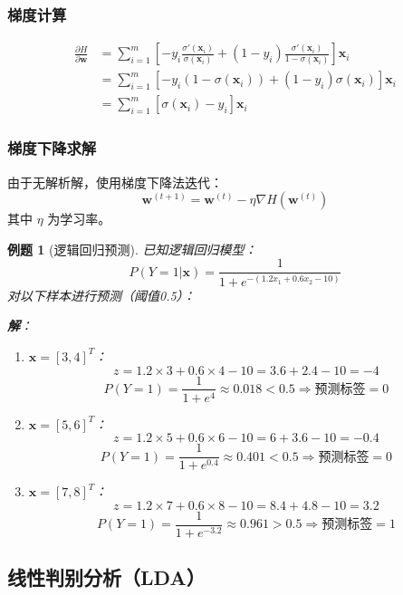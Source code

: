 \documentclass[12pt,a4paper]{ctexart}
\newtheorem{exercise}{例题}[section]
\begin{document}
\subsubsection{梯度计算}

\begin{align*}
\frac{\partial H}{\partial \mathbf{w}} &= \sum_{i=1}^{m}\left[-y_i\frac{\sigma'(\mathbf{x}_i)}{\sigma(\mathbf{x}_i)} + (1-y_i)\frac{\sigma'(\mathbf{x}_i)}{1-\sigma(\mathbf{x}_i)}\right]\mathbf{x}_i \\
&= \sum_{i=1}^{m}\left[-y_i(1-\sigma(\mathbf{x}_i)) + (1-y_i)\sigma(\mathbf{x}_i)\right]\mathbf{x}_i \\
&= \sum_{i=1}^{m}\left[\sigma(\mathbf{x}_i) - y_i\right]\mathbf{x}_i
\end{align*}

\subsubsection{梯度下降求解}

由于无解析解，使用梯度下降法迭代：
\[
\mathbf{w}^{(t+1)} = \mathbf{w}^{(t)} - \eta \nabla H(\mathbf{w}^{(t)})
\]
其中 $\eta$ 为学习率。

\begin{exercise}[逻辑回归预测]
已知逻辑回归模型：
\[
P(Y=1|\mathbf{x}) = \frac{1}{1 + e^{-(1.2x_1 + 0.6x_2 - 10)}}
\]
对以下样本进行预测（阈值0.5）：

\textbf{解}：
\begin{enumerate}
    \item $\mathbf{x} = [3, 4]^T$：
    \[
    z = 1.2 \times 3 + 0.6 \times 4 - 10 = 3.6 + 2.4 - 10 = -4
    \]
    \[
    P(Y=1) = \frac{1}{1+e^4} \approx 0.018 < 0.5 \Rightarrow \text{预测标签} = 0
    \]
    
    \item $\mathbf{x} = [5, 6]^T$：
    \[
    z = 1.2 \times 5 + 0.6 \times 6 - 10 = 6 + 3.6 - 10 = -0.4
    \]
    \[
    P(Y=1) = \frac{1}{1+e^{0.4}} \approx 0.401 < 0.5 \Rightarrow \text{预测标签} = 0
    \]
    
    \item $\mathbf{x} = [7, 8]^T$：
    \[
    z = 1.2 \times 7 + 0.6 \times 8 - 10 = 8.4 + 4.8 - 10 = 3.2
    \]
    \[
    P(Y=1) = \frac{1}{1+e^{-3.2}} \approx 0.961 > 0.5 \Rightarrow \text{预测标签} = 1
    \]
\end{enumerate}
\end{exercise}

\subsection{线性判别分析（LDA）}
\end{document}
